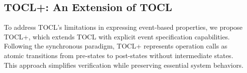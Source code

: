 




\subsection{TOCL+: An Extension of TOCL}

\hspace{1cm} To address TOCL's limitations in expressing event-based properties, 
we propose TOCL+, which extends TOCL with explicit event specification capabilities. 
Following the synchronous paradigm, TOCL+ represents operation calls as atomic 
transitions from pre-states to post-states without intermediate states. This approach 
simplifies verification while preserving essential system behaviors.

